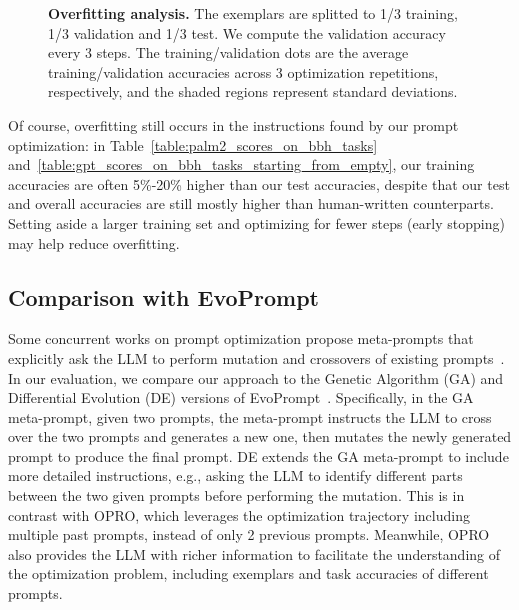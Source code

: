 \begin{figure}[t]
\centering
{}
\hspace{.05\linewidth}
\caption{\textbf{Overfitting analysis.}
The exemplars are splitted to 1/3 training, 1/3 validation and 1/3 test.
We compute the validation accuracy every 3 steps.
The training/validation dots are the average training/validation accuracies across 3 optimization repetitions, respectively, and the shaded regions represent standard deviations.
}
\label{fig:overfitting_analysis}
\end{figure}

Of course, overfitting still occurs in the instructions found by our prompt optimization: in Table~\ref{table:palm2_scores_on_bbh_tasks} and~\ref{table:gpt_scores_on_bbh_tasks_starting_from_empty}, our training accuracies are often 5\%-20\% higher than our test accuracies, despite that our test and overall accuracies are still mostly higher than human-written counterparts.
Setting aside a larger training set and optimizing for fewer steps (early stopping) may help reduce overfitting.

\subsection{Comparison with EvoPrompt}
\label{sec:comparison_with_evoprompt}
Some concurrent works on prompt optimization propose meta-prompts that explicitly ask the LLM to perform mutation and crossovers of existing prompts~\citep{fernando2023promptbreeder,guo2023connecting}. In our evaluation, we compare our approach to the Genetic Algorithm (GA) and Differential Evolution (DE) versions of EvoPrompt~\citep{guo2023connecting}. Specifically, in the GA meta-prompt, given two prompts, the meta-prompt instructs the LLM to cross over the two prompts and generates a new one, then mutates the newly generated prompt to produce the final prompt. DE extends the GA meta-prompt to include more detailed instructions, e.g., asking the LLM to identify different parts between the two given prompts before performing the mutation. This is in contrast with OPRO, which leverages the optimization trajectory including multiple past prompts, instead of only 2 previous prompts. Meanwhile, OPRO also provides the LLM with richer information to facilitate the understanding of the optimization problem, including exemplars and task accuracies of different prompts.

